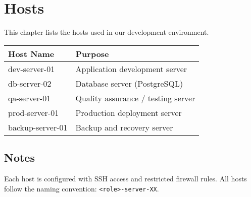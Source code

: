 \chapter{Hosts}
\label{ch:hosts}

This chapter lists the hosts used in our development environment.

\begin{longtable}{|l|l|}
\hline
\textbf{Host Name} & \textbf{Purpose} \\
\hline
dev-server-01 & Application development server \\
\hline
db-server-02 & Database server (PostgreSQL) \\
\hline
qa-server-01 & Quality assurance / testing server \\
\hline
prod-server-01 & Production deployment server \\
\hline
backup-server-01 & Backup and recovery server \\
\hline
\end{longtable}

\section{Notes}
Each host is configured with SSH access and restricted firewall rules.  
All hosts follow the naming convention: \texttt{<role>-server-XX}.
